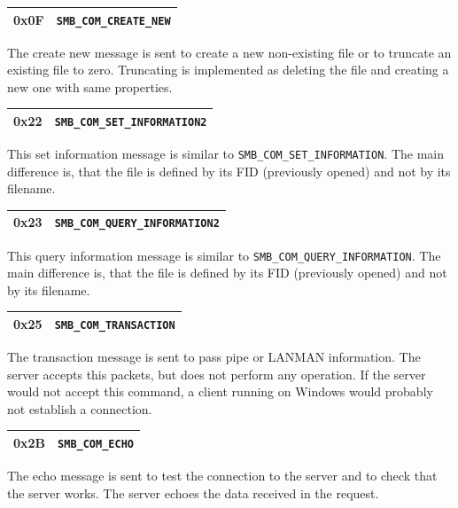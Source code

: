 \documentclass[11pt,a4paper]{book}
\begin{document}
\begin{center}
\renewcommand{\tabcolsep}{5mm}
\begin{tabular}{p{3cm}p{8cm}}
0x0F & \texttt{SMB\_COM\_CREATE\_NEW} \\
\hline
\end{tabular}
\end{center}
The create new message is sent to create a new non-existing file or to truncate an existing file to zero. Truncating is implemented as deleting the file and creating a new one with same properties.

\begin{center}
\renewcommand{\tabcolsep}{5mm}
\begin{tabular}{p{3cm}p{8cm}}
0x22 & \texttt{SMB\_COM\_SET\_INFORMATION2} \\
\hline
\end{tabular}
\end{center}
This set information message is similar to \texttt{SMB\_COM\_SET\_INFORMATION}. The main difference is, that the file is defined by its FID (previously opened) and not by its filename.

\begin{center}
\renewcommand{\tabcolsep}{5mm}
\begin{tabular}{p{3cm}p{8cm}}
0x23 & \texttt{SMB\_COM\_QUERY\_INFORMATION2} \\
\hline
\end{tabular}
\end{center}
This query information message is similar to \texttt{SMB\_COM\_QUERY\_INFORMATION}. The main difference is, that the file is defined by its FID (previously opened) and not by its filename.

\begin{flushleft}
\begin{center}
\renewcommand{\tabcolsep}{5mm}
\begin{tabular}{p{3cm}p{8cm}}
0x25 & \texttt{SMB\_COM\_TRANSACTION} \\
\hline
\end{tabular}
\end{center}
The transaction message is sent to pass pipe or LANMAN information. The server accepts this packets, but does not perform any operation. If the server would not accept this command, a client running on Windows would probably not establish a connection.
\end{flushleft}

\begin{center}
\renewcommand{\tabcolsep}{5mm}
\begin{tabular}{p{3cm}p{8cm}}
0x2B & \texttt{SMB\_COM\_ECHO} \\
\hline
\end{tabular}
\end{center}
The echo message is sent to test the connection to the server and to check that the server works. The server echoes the data received in the request.
\end{document}
